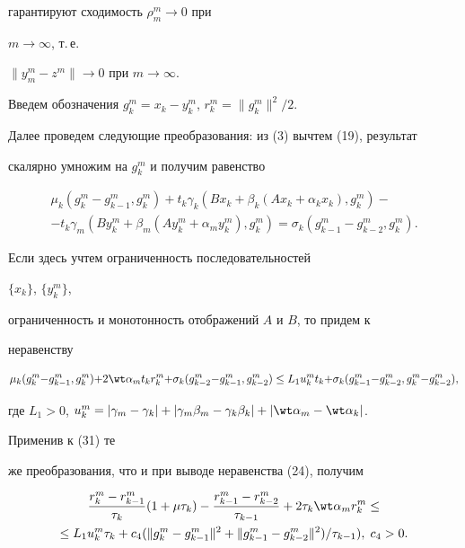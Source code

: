 гарантируют сходимость $\rho_m^m \rightarrow 0$ при


$m \rightarrow\infty $, т.\,е.


$\|y_m^m-z^m\| \rightarrow 0$ при $m \rightarrow \infty$.





Введем обозначения $g_k^m=x_k-y_k^m$, $r_k^m=\|g_k^m\|^2/2$.


Далее проведем следующие преобразования: из (3) вычтем (19), результат


скалярно умножим на $g_k^m$ и получим равенство


\begin{multline*}


\mu_k(g^m_k-g^m_{k-1},g_k^m)+t_k\gamma_k(Bx_k+\beta_k(Ax_k+\alpha


_kx_k),g_k^m)- \\


-t_k\gamma_m(By_k^m+\beta_m(Ay_k^m+\alpha_my_k^m),g_k^m)=


\sigma_k(g_{k-1}^m-g_{k-2}^m,g_k^m).


\end{multline*}


Если здесь учтем ограниченность последовательностей


$\{x_k\}$, $\{y_k^m\}$,


ограниченность и монотонность отображений $A$ и $B$, то придем к


неравенству


\begin{equation}\label {31}


\mu_k(g^m_k{-}g^m_{k-1},g_k^m){+}2\wt \alpha_mt_kr_k^m{+}\sigma_k


(g_{k-2}^m{-}g_{k-1}^m,g_{k-2}^m)\leq


L_1u^m_kt_k{+}\sigma_k(g_{k-1}^m{-}g_{k-2}^m,g_k^m{-}g_{k-2}^m),


\end{equation}


где $L_1 >0$, $u^m_k=|\gamma_m-\gamma_k| +|\gamma_m\beta_m-


\gamma_k\beta_k| +|\wt \alpha_m-\wt \alpha_k|$.


Применив к (31) те


же преобразования, что и при выводе неравенства (24), получим


\begin{multline}\label {32}


\frac{r_k^m -r_{k-1}^m}{\tau_k}(1+\mu \tau_k)-


\frac{r_{k-1}^m -r_{k-2}^m}{\tau_{k-1}}+2\tau_k\wt \alpha_mr_k^m \leq \\


\le L_1u^m_k\tau_k+c_4(\|g_k^m-g_{k-1}^m\|^2+


\|g_{k-1}^m-g_{k-2}^m\|^2)/\tau_{k-1}),\;c_4>0.


\end{multline}


